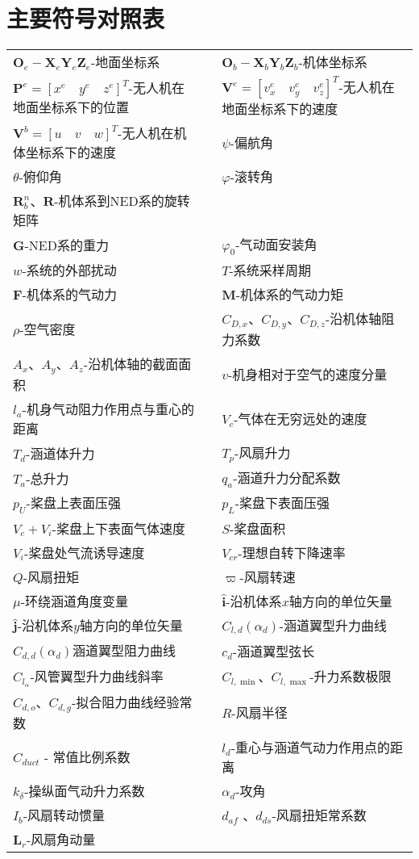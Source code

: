 \chapter{主要符号对照表}

\begin{table}
	\centering{}%
	\begin{tabular}{l>{\centering}p{0.5cm}l}
	 $ \boldsymbol{O}_e-\boldsymbol{X}_e\boldsymbol{Y}_e\boldsymbol{Z}_e $-地面坐标系  &  & ${\boldsymbol{O}_b}-{\boldsymbol{X}_b}{\boldsymbol{Y}_b}{\boldsymbol{Z}_b}$-机体坐标系\tabularnewline
     $\boldsymbol{P}^{e}=[{x}^{e} \quad {y}^{e} \quad {z}^{e}]^{T}$-无人机在地面坐标系下的位置 &  & $\boldsymbol{V}^{e}=[{v}^{e}_{x} \quad {v}^{e}_{y} \quad {v}^{e}_{z}]^{T}$-无人机在地面坐标系下的速度\tabularnewline
     $\boldsymbol{V}^{b}=[{u} \quad {v} \quad {w}]^{T}$-无人机在机体坐标系下的速度 && $ \psi $-偏航角\tabularnewline
	 $\theta$-俯仰角                                                    && $\varphi$-滚转角\tabularnewline
	 $\boldsymbol{R}^n_b$、$\boldsymbol{R}$-机体系到NED系的旋转矩阵\tabularnewline
	 $\boldsymbol{G}$-NED系的重力  							  &  &   $\varphi_0 $-气动面安装角\tabularnewline
	 $ w $-系统的外部扰动								&  &  $T$-系统采样周期\tabularnewline
	 $\boldsymbol{F}$-机体系的气动力 						    &  &   $\boldsymbol{M}$-机体系的气动力矩\tabularnewline
	 $\rho$-空气密度 								  &  &  $C_{D,x} $、$ C_{D,y} $、$ C_{D,z} $-沿机体轴阻力系数\tabularnewline
	 $A_x $、$ A_y $、$ A_z $-沿机体轴的截面面积 		 &  &  $v$-机身相对于空气的速度分量\tabularnewline 
	 $l_{a}$-机身气动阻力作用点与重心的距离   			  &  &  $V_c$-气体在无穷远处的速度\tabularnewline
	 $T_d$-涵道体升力  								 &  &  $T_p$-风扇升力\tabularnewline
	 $T_a$-总升力 								      &  &  $q_a$-涵道升力分配系数\tabularnewline
	 $ p_U $-桨盘上表面压强 						   &  &  $p_L$-桨盘下表面压强\tabularnewline
	 $V_c+V_i$-桨盘上下表面气体速度 					 &  &  $S$-桨盘面积\tabularnewline
	 $ V_i $-桨盘处气流诱导速度 						  &  &  $ V_{cr} $-理想自转下降速率\tabularnewline
	 $ Q $-风扇扭矩 								 &  &  $ \varpi $-风扇转速\tabularnewline
	 $\mu$-环绕涵道角度变量 						  &  &  $\hat{\boldsymbol{i}}$-沿机体系$x$轴方向的单位矢量\tabularnewline 
	 $\hat{\boldsymbol{j}}$-沿机体系$y$轴方向的单位矢量  	   &  &  $C_{l, d}(\alpha_d)$-涵道翼型升力曲线\tabularnewline 
	 $C_{d, d}(\alpha_d)$涵道翼型阻力曲线  		      &  &  $c_d$-涵道翼型弦长\tabularnewline 
	 $C_{l_{\alpha}}$-风管翼型升力曲线斜率  			 &  &  $C_{l, \min }$、$ C_{l, \max } $-升力系数极限\tabularnewline 
	 $C_{d, o }$、$C_{d, g }$-拟合阻力曲线经验常数 	&  &  $R$-风扇半径\tabularnewline 
	 $C_{d u c t}$ - 常值比例系数  					&  &  $l_{d}$-重心与涵道气动力作用点的距离\tabularnewline
	 $k_{\delta}$-操纵面气动升力系数 				 &  &  $\alpha_d$-攻角\tabularnewline
	 $ I_{b}$-风扇转动惯量  						   &  &  $ d_{af} $ 、$ d_{ds} $-风扇扭矩常系数\tabularnewline
	 $\boldsymbol{L}_{{r}}$-风扇角动量  						&  & \tabularnewline 					
	\end{tabular}
\end{table}